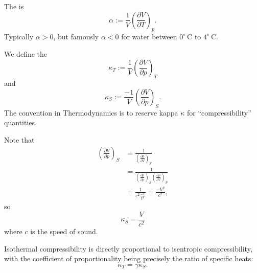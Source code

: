 \begin{definition}
The  is
\begin{equation*}
\alpha := \frac{1}{V}\left(\frac{\partial V}{\partial T}\right)_{p}.
\end{equation*}
Typically $\alpha>0$, but famously $\alpha<0$ for water between
$0^{\circ}~\mathrm{C}$ to $4^{\circ}~\mathrm{C}$.
\end{definition}

\begin{definition}
We define the 
\begin{equation}
\kappa_{T} := \frac{1}{V}\left(\frac{\partial V}{\partial p}\right)_{T}
\end{equation}
and 
\begin{equation}
\kappa_{S} := \frac{-1}{V}\left(\frac{\partial V}{\partial p}\right)_{S}.
\end{equation}
The convention in Thermodynamics is to reserve kappa $\kappa$ for
``compressibility'' quantities.
\end{definition}

\begin{remark}\label{eq:lec16:fall:partial-V-partial-p}
Note that
\begin{subequations}
  \begin{align}
\left(\frac{\partial V}{\partial p}\right)_{S}
&= \frac{1}{\left(\frac{\partial p}{\partial V}\right)_{S}}\\
&= \frac{1}{\left(\frac{\partial p}{\partial \rho}\right)_{S}\left(\frac{\partial \rho}{\partial V}\right)_{S}}\\
&= \frac{1}{c^{2}\frac{-1}{V^{2}}}=\frac{-V^{2}}{c^{2}},
  \end{align}
\end{subequations}
so
\begin{equation}
\kappa_{S} = \frac{V}{c^{2}}
\end{equation}
where $c$ is the speed of sound.
\end{remark}

\begin{proposition}
Isothermal compressibility is directly proportional to isentropic
compressibility, with the coefficient of proportionality being
precisely the ratio of specific heats:
\begin{equation}
\kappa_{T} = \gamma\kappa_{S}.
\end{equation}
\end{proposition}

